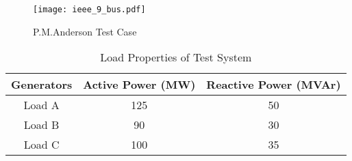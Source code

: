 \begin{figure}[h]
	\centering
	\texttt{[image: ieee\_9\_bus.pdf]}
	\caption{P.M.Anderson Test Case}
	\label{ieee_9_bus}
\end{figure}
\begin{table}[h!]
	\centering
	\begin{tabular}{ccc}
		\hline
		\textbf{Generators} & \textbf{Active Power (MW)}  & \textbf{Reactive Power (MVAr)} \\ \hline
		Load A              & 125                      	  & 50				 \\
		Load B              & 90                          & 30                \\
		Load C              & 100                         & 35                \\ \hline
	\end{tabular}
	\caption{Load Properties of Test System}
	\label{loadproperties}
\end{table}
